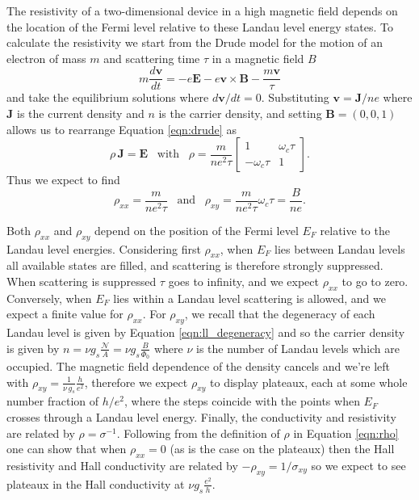 \documentclass[edeposit,fullpage,draftthesis]{uiucthesis2009}
\begin{document}
        The resistivity of a two-dimensional device in a high magnetic field depends on the location of the Fermi level
        relative to these Landau level energy states. To calculate the resistivity we start from the Drude model 
        for the motion of an electron of mass $m$ and scattering time $\tau$ in a magnetic field $B$
        \begin{equation}
            m \frac{d \mathbf{v}}{dt} = -e \mathbf{E} - e \mathbf{v} \times \mathbf{B} - \frac{m \mathbf{v}}{\tau}
            \label{eqn:drude}
        \end{equation}
        and take the equilibrium solutions where $d \mathbf{v}/dt = 0$. Substituting $\mathbf{v} = \mathbf{J} / n e$
        where $\mathbf{J}$ is the current density and $n$ is the carrier density, and setting $\mathbf{B} = (0,0,1)$
        allows us to rearrange Equation \ref{eqn:drude} as
        \begin{equation}
            \rho \, \mathbf{J} = \mathbf{E} \;\;\; \text{with} \;\;\; \rho = \frac{m}{n e^2 \tau} \begin{bmatrix} 1 & \omega_c \tau \\ - \omega_c \tau & 1 \end{bmatrix}.     
            \label{eqn:rho}
        \end{equation}
        Thus we expect to find
        \begin{equation}
            \rho_{xx} = \frac{m}{n e^2 \tau} \;\;\; \text{and} \;\;\; \rho_{xy} = \frac{m}{n e^2 \tau} \omega_c \tau = \frac{B}{n e}.
        \end{equation}
        
        Both $\rho_{xx}$ and $\rho_{xy}$ depend on the position of the Fermi level $E_F$ relative to the Landau level
        energies. Considering first $\rho_{xx}$, when $E_F$ lies between Landau levels all available states are filled,
        and scattering is therefore strongly suppressed. When scattering is suppressed $\tau$ goes to infinity, and 
        we expect $\rho_{xx}$ to go to zero. Conversely, when $E_F$ lies within a Landau level scattering is allowed,
        and we expect a finite value for $\rho_{xx}$.
        For $\rho_{xy}$, we recall that the degeneracy of each Landau level is given by Equation \ref{eqn:ll_degeneracy}
        and so the carrier density is given by $n = \nu g_s \frac{\mathcal{N}}{A} = \nu g_s \frac{B}{\Phi_0}$ where $\nu$ 
        is the number of Landau levels which are occupied. The magnetic field dependence of the density cancels
        and we're left with $\rho_{xy} = \frac{1}{\nu\,g_s} \frac{h}{e^2}$,
        therefore we expect $\rho_{xy}$ to display plateaux, each at some whole number fraction of $h / e^2$, 
        where the steps coincide with the points when $E_F$ crosses through a Landau level energy.
        Finally, the conductivity and resistivity are related by $\rho = \sigma^{-1}$. Following from
        the definition of $\rho$ in Equation \ref{eqn:rho} one can show that when $\rho_{xx} = 0$
        (as is the case on the plateaux) then the Hall resistivity and Hall conductivity are related by
        $-\rho_{xy} = 1 / \sigma_{xy}$ so we expect to see plateaux in the Hall conductivity at $\nu g_s \frac{e^2}{h}$.
         
\end{document}
